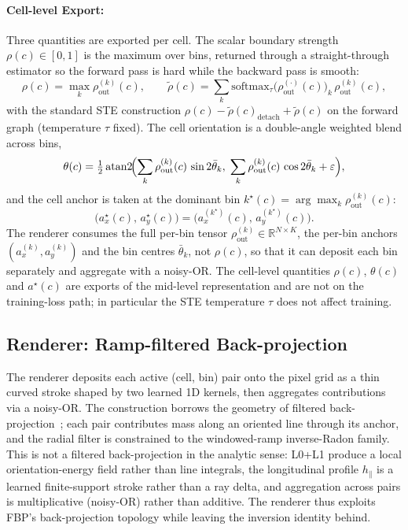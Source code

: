 \documentclass[11pt,a4paper]{article}
\newcommand{\R}{\mathbb{R}}
\begin{document}
\paragraph{Cell-level Export:}
Three quantities are exported per cell. The scalar boundary strength $\rho(c) \in [0, 1]$ is the maximum over bins, returned through a straight-through estimator so the forward pass is hard while the backward pass is smooth:
\begin{equation}\label{eq:rho-cell}
  \rho(c) = \max_k \rho_{\mathrm{out}}^{(k)}(c),
  \qquad
  \tilde\rho(c) = \sum_k \mathrm{softmax}_\tau\!\bigl(\rho_{\mathrm{out}}^{(\cdot)}(c)\bigr)_k\, \rho_{\mathrm{out}}^{(k)}(c),
\end{equation}
with the standard STE construction $\rho(c) - \tilde\rho(c)_{\mathrm{detach}} + \tilde\rho(c)$ on the forward graph (temperature $\tau$ fixed). The cell orientation is a double-angle weighted blend across bins,
\begin{equation}\label{eq:theta-cell}
  \theta(c) = \tfrac{1}{2}\operatorname{atan2}\!\Bigl(
    \sum_k \rho_{\mathrm{out}}^{(k)}(c)\, \sin 2\bar\theta_k,\;
    \sum_k \rho_{\mathrm{out}}^{(k)}(c)\, \cos 2\bar\theta_k + \varepsilon\Bigr),
\end{equation}
and the cell anchor is taken at the dominant bin $k^\star(c) = \arg\max_k \rho_{\mathrm{out}}^{(k)}(c)$:
\begin{equation}\label{eq:anchor-cell}
  \bigl(a_x^\star(c),\, a_y^\star(c)\bigr) = \bigl(a_x^{(k^\star)}(c),\, a_y^{(k^\star)}(c)\bigr).
\end{equation}
The renderer consumes the full per-bin tensor $\rho_{\mathrm{out}}^{(k)} \in \R^{N\times K}$, the per-bin anchors $(a_x^{(k)}, a_y^{(k)})$ and the bin centres $\bar\theta_k$, not $\rho(c)$, so that it can deposit each bin separately and aggregate with a noisy-OR. The cell-level quantities $\rho(c)$, $\theta(c)$ and $a^\star(c)$ are exports of the mid-level representation and are not on the training-loss path; in particular the STE temperature $\tau$ does not affect training.

\subsection{Renderer: Ramp-filtered Back-projection}\label{sec:render}

The renderer deposits each active (cell, bin) pair onto the pixel grid as a thin curved stroke shaped by two learned 1D kernels, then aggregates contributions via a noisy-OR. The construction borrows the geometry of filtered back-projection~\cite{kak2001ct}; each pair contributes mass along an oriented line through its anchor, and the radial filter is constrained to the windowed-ramp inverse-Radon family. This is not a filtered back-projection in the analytic sense: L0+L1 produce a local orientation-energy field rather than line integrals, the longitudinal profile $h_\parallel$ is a learned finite-support stroke rather than a ray delta, and aggregation across pairs is multiplicative (noisy-OR) rather than additive. The renderer thus exploits FBP's back-projection topology while leaving the inversion identity behind.
\end{document}
